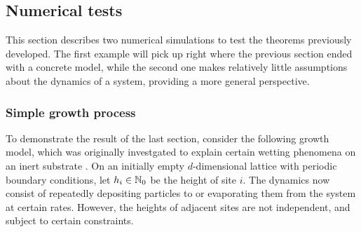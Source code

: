 \subsection{Numerical tests}

This section describes two numerical simulations to test the theorems previously developed. The first example will pick up right where the previous section ended with a concrete model, while the second one makes relatively little assumptions about the dynamics of a system, providing a more general perspective.


\subsubsection{Simple growth process}

To demonstrate the result of the last section, consider the following growth model, which was originally investgated to explain certain wetting phenomena on an inert substrate \cite{wet1, wet2}. On an initially empty \(d\)-dimensional lattice with periodic boundary conditions, let \(h_i \in\mathbb{N}_0\) be the height of site \(i\). The dynamics now consist of repeatedly depositing particles to or evaporating them from the system at certain rates. However, the heights of adjacent sites are not independent, and subject to certain constraints.

